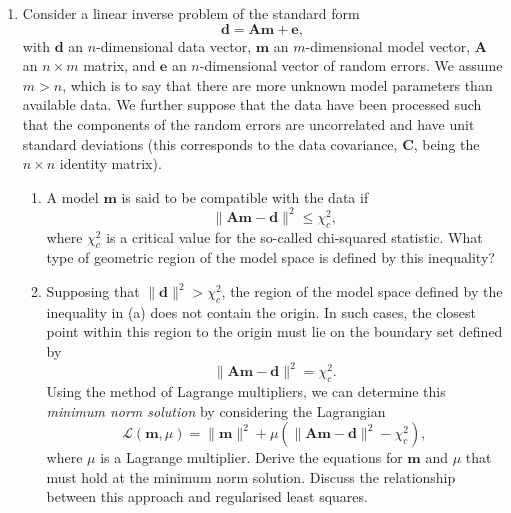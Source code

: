 \begin{enumerate}
\item

Consider a linear inverse problem of the standard form
\begin{equation*}
    \mathbf{d} = \mathbf{A}\mathbf{m}+\mathbf{e},
\end{equation*}
with $\mathbf{d}$ an $n$-dimensional data vector, $\mathbf{m}$ an $m$-dimensional model vector, $\mathbf{A}$ an $n\times m$ matrix, and $\mathbf{e}$ an $n$-dimensional vector of random errors. We assume $m > n$, which
is to say that there are more unknown model parameters than available data.
We further suppose that the data have been processed such that the components of the random errors are uncorrelated and have unit standard deviations (this corresponds to the data covariance, $\mathbf{C}$, being the $n\times n$ identity matrix).



\begin{enumerate}

    \item A model $\mathbf{m}$ is said to be compatible with the data if
\begin{equation*}
    \|\mathbf{A}\mathbf{m}-\mathbf{d}\|^{2} \le \chi^{2}_{c},
\end{equation*}
where $\chi^{2}_{c}$ is a critical value for the so-called chi-squared statistic. What type of geometric region of the model space is defined by this inequality?

\item Supposing that $\|\mathbf{d}\|^{2} > \chi^{2}_{c}$, the region of the model space defined by the inequality in (a) does not contain the origin. In such
cases, the closest point within this region to the origin must lie on the boundary set defined by
\begin{equation*}
    \|\mathbf{A}\mathbf{m}-\mathbf{d}\|^{2} = \chi^{2}_{c}.
\end{equation*}
Using the method of Lagrange multipliers, we can determine this \emph{minimum norm solution} by considering the Lagrangian
\begin{equation*}
    \mathcal{L}(\mathbf{m},\mu)=\|\mathbf{m}\|^{2}+\mu(\|\mathbf{A}\mathbf{m}-\mathbf{d}\|^{2}-\chi^{2}_{c}),
\end{equation*}
where $\mu$ is a Lagrange multiplier. Derive the equations for $\mathbf{m}$ and $\mu$ that must hold at the minimum norm solution.
Discuss the relationship between this approach and regularised least squares.
\end{enumerate}



\end{enumerate}
